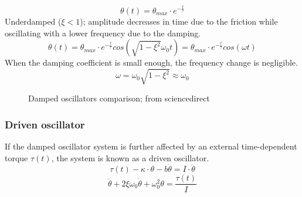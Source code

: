 \documentclass[\main/master.tex]{subfiles}
\begin{document}
\begin{equation}
\theta(t) = \theta_{max}\cdot e^{-\frac{t}{\tau}}     \label{eqn:underdamped_motion_equation}
\end{equation}
Underdamped ($\xi < 1$); amplitude decreases in time due to the friction while oscillating with a lower frequency due to the damping. 
\begin{equation}
\theta(t) = \theta_{max}\cdot e^{-\frac{t}{\tau}}cos(\sqrt{1-\xi^2}\omega_0 t ) =  \theta_{max}\cdot e^{-\frac{t}{\tau}}cos(\omega t )    \label{eqn:underdamped_motion_equation}
\end{equation}
When the damping coefficient is small enough, the frequency change is negligible.
\begin{equation}
\omega = \omega_0\sqrt{1-\xi^2}\approx\omega_0    \label{eqn:underdamped_frequency}
\end{equation}

\begin{figure}[htbp]
	\centering
	\caption[Damped oscillators comparison]{Damped oscillators comparison; from sciencedirect \cite{underdamped-system}}
	\label{fig:damped_oscillators}
\end{figure}
\FloatBarrier
\iffalse
https://ocw.mit.edu/courses/mathematics/18-03sc-differential-equations-fall-2011/unit-ii-second-order-constant-coefficient-linear-equations/damped-harmonic-oscillators/MIT18_03SCF11_s13_2text.pdf

https://www.sciencedirect.com/topics/engineering/underdamped-system#:~:text=When%
\fi
\subsubsection{Driven oscillator}
If the damped oscillator system is further affected by an external time-dependent torque $\tau(t)$, the system is known as a driven oscillator.
\begin{equation}
\tau(t) -\kappa\cdot\theta - b\dot{\theta}  = I\cdot\ddot{\theta}   \label{eqn:driven_motion_equation}
\end{equation} 
\begin{equation}
\ddot{\theta} + 2\xi\omega_0\dot{\theta} + \omega_0^2\theta = \frac{\tau(t)}{I}   \label{eqn:damped_motion_equation}
\end{equation}
\end{document}
